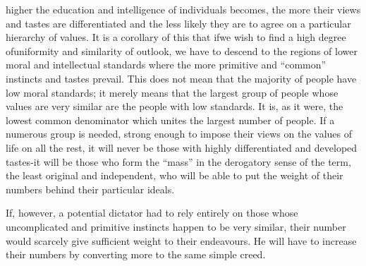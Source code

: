\documentclass[11pt,openany]{book}
\begin{document}
higher the education and intelligence of individuals becomes, the more their views and tastes are differentiated and the less likely they are to agree on a particular hierarchy of values. It is a corollary of this that ifwe wish to find a high degree ofuniformity and similarity of outlook, we have to descend to the regions of lower moral and intellectual standards where the more primitive and ``common'' instincts and tastes prevail. This does not mean that the majority of people have low moral standards; it merely means that the largest group of people whose values are very similar are the people with low standards. It is, as it were, the lowest common denominator which unites the largest number of people. If a numerous group is needed, strong enough to impose their views on the values of life on all the rest, it will never be those with highly differentiated and developed tastes-it will be those who form the ``mass'' in the derogatory sense of the term, the least original and independent, who will be able to put the weight of their numbers behind their particular ideals.

If, however, a potential dictator had to rely entirely on those whose uncomplicated and primitive instincts happen to be very similar, their number would scarcely give sufficient weight to their endeavours. He will have to increase their numbers by converting more to the same simple creed.
\end{document}
